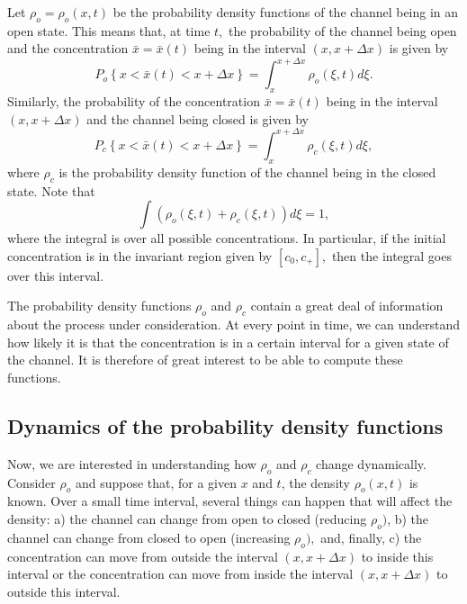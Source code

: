 Let $\rho_{o}=\rho_{o}\left(  x,t\right)  $ be the probability density
functions of the channel being in an open state. This means that, at time $t,$
the probability of the channel being open and the concentration $\bar{x}
=\bar{x}(t)$ being in the interval $(x,x+\Delta x)$ is given by
\begin{equation}
P_{o}\left\{  x<\bar{x}(t)<x+\Delta x\right\}  =\int_{x}^{x+\Delta x}\rho
_{o}\left(  \xi,t\right)  d\xi. \label{probopen}
\end{equation}
Similarly, the probability of the concentration $\bar{x}=\bar{x}(t)$ being in
the interval $(x,x+\Delta x)$ and the channel being closed is given by
\begin{equation}
P_{c}\left\{  x<\bar{x}(t)<x+\Delta x\right\}  =\int_{x}^{x+\Delta x}\rho
_{c}\left(  \xi,t\right)  d\xi, \label{prob_closed}
\end{equation}
where $\rho_c$ is the probability density
function of the channel being in the closed state. Note that
\begin{equation}
\int\left(  \rho_{o}\left(  \xi,t\right)  +\rho_{c}\left(  \xi,t\right)
\right)  d\xi=1, \label{integral1}
\end{equation}
where the integral is over all possible concentrations. In particular, if the initial
concentration is in the invariant region given by $\left[  c_{0}
,c_{+}\right],$ then the integral goes over this interval.

The probability density functions $\rho_o$ and $\rho_c$ contain a great deal of information about the
process under consideration. At every point in time, we can understand how likely it is that the concentration is in a certain interval for a given state of the channel. 
It is therefore of great interest to be able to compute these functions.


\bigskip

\subsection{Dynamics of the probability density functions}

Now, we are interested in understanding how $\rho_{o}$ and $\rho_{c}$ change
dynamically. 
Consider $\rho_{o}$ and suppose that, for a given $x$ and $t$, the
density $\rho_{o}(x,t)$ is known. Over a small time interval, several things
can happen that will affect the density: a) the channel can change from open to
closed (reducing $\rho_{o})$, b) the channel can change from closed to open
(increasing $\rho_{o}),$ and, finally, c) the concentration can move from
outside the interval $(x,x+\Delta x)$ to inside this interval or the
concentration can move from inside the interval $(x,x+\Delta x)$ to outside
this interval.

